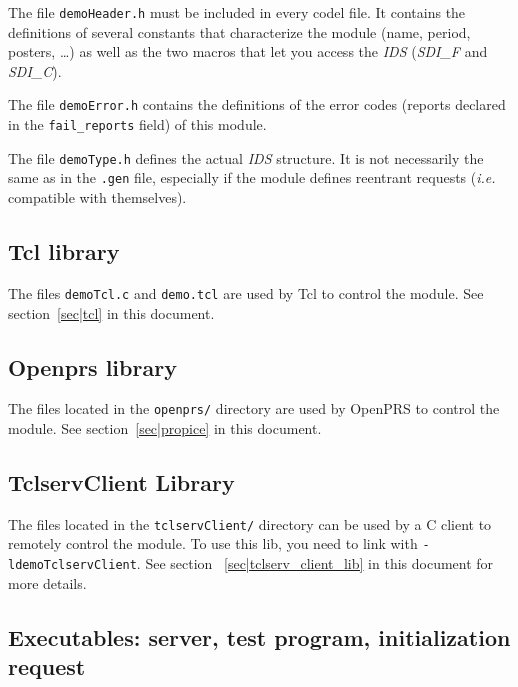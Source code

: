 The file \texttt{demoHeader.h} must  be included  in every  codel file.  It
contains the definitions of several constants that characterize the module
(name, period, posters, \ldots)  as well as the two  macros that let  you
access the \emph{IDS} (\emph{SDI\_F} and \emph{SDI\_C}).

The file  \texttt{demoError.h} contains the  definitions of the  error codes
(reports declared in the \texttt{fail\_reports} field) of this module.

The file \texttt{demoType.h} defines the actual \emph{IDS} structure. It is
not necessarily the same as  in the  \texttt{.gen}  file, especially if  the
module   defines   reentrant   requests   (\emph{i.e.}   compatible  with
themselves).

\subsection{Tcl library}

The files  \texttt{demoTcl.c} and \texttt{demo.tcl}  are used by Tcl to control
the module. See section~\ref{sec|tcl} in this document.


\subsection{Openprs library}

The files located in the \texttt{openprs/} directory are  used by OpenPRS to
control the module. See section~\ref{sec|propice} in this document.


\subsection{TclservClient Library}

The files located in the \texttt{tclservClient/} directory can be used by a C
client to remotely control the module. To use this lib, you need to link with 
\texttt{-ldemoTclservClient}. See section ~\ref{sec|tclserv_client_lib}
in this document for more details.

\subsection{Executables: server, test program, initialization request}

